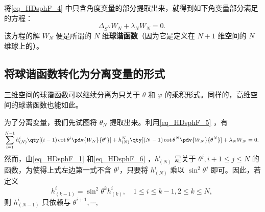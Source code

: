 将\autoref{eq_HDsphF_4} 中只含角度变量的部分提取出来，就得到如下角变量部分满足的方程：
\begin{equation}
\Delta_{S^N}W_N+\lambda_N W_N=0.~
\end{equation}
该方程的解 $W_N$ 便是所谓的 $N$ 维\textbf{球谐函数}（因为它是定义在 $N+1$ 维空间的 $N$ 维球上的）。

\subsection{将球谐函数转化为分离变量的形式}
三维空间的球谐函数可以继续分离为只关于 $\theta$ 和 $\varphi$ 的乘积形式。同样的，高维空间的球谐函数也能如此。

为了分离变量，我们先试图将 $\theta_N$ 提取出来。利用\autoref{eq_HDsphF_5} ，有
\begin{equation}
\sum_{i=1}^{N-1} h^{i}_{(N)}\qty[(i-1)\cot\theta^i\pdv{W_N}{\theta^i}]+h^{N}_{(N)}\qty[(N-1)\cot\theta^N\pdv{W_N}{\theta^N}]+\lambda_N W_N=0.~
\end{equation}
然而，由\autoref{eq_HDsphF_1} 和\autoref{eq_HDsphF_6} ，$h^i_{(N)}$ 是关于 $\theta^j,i+1\leq j\leq N$ 的函数，为使得上式左边第一式不含 $\theta^j$，只要将 $h^i_{(N)}$ 乘以 $\sin^2\theta^j$ 即可。因此，若定义
\begin{equation}
h^{i}_{(k-1)}=\sin^2\theta^k h^i_{(k)},\quad 1\leq i\leq k-1,2\leq k\leq N,~
\end{equation}
则 $h^i_{(N-1)}$ 只依赖与 $\theta ^{i+1},\cdots,$










